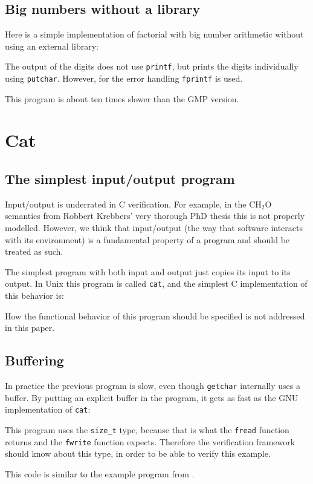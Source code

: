 \documentclass{article}
\begin{document}
\subsection{Big numbers without a library}
Here is a simple implementation of factorial with big number arithmetic without
using an external library:

The output of the digits does not use \texttt{printf}, but prints
the digits individually using \texttt{putchar}.
However, for the error handling \texttt{fprintf} is used.

This program is about ten times slower than the GMP version.

\section{Cat}

\subsection{The simplest input/output program}
Input/output is underrated in C verification.
For example, in the CH$_2$O semantics from Robbert Krebbers' very thorough PhD thesis \cite{kre:15} this
is not properly modelled.
However, we think that input/output (the way that
software interacts with its environment) is a fundamental property of a program
and should be treated as such.

The simplest program with both input and output just copies its input to its output.
In Unix this program is called \texttt{cat}, and the simplest C implementation of this behavior is:

How the functional behavior of this program should be {specified} is not addressed in this paper.

\subsection{Buffering}
In practice the previous program is slow, even though \texttt{getchar} internally uses a buffer.
By putting an explicit buffer in the program, it gets as fast as the GNU implementation of \texttt{cat}:

This program uses the \lstinline|size_t| type, because that is what the \lstinline|fread| function returns and the \lstinline|fwrite| function expects.
Therefore the verification framework should know about this type, in order to be able to verify this example.

This code is similar to the example program from \cite{gun:myr:kum:nor:17}.
\end{document}
